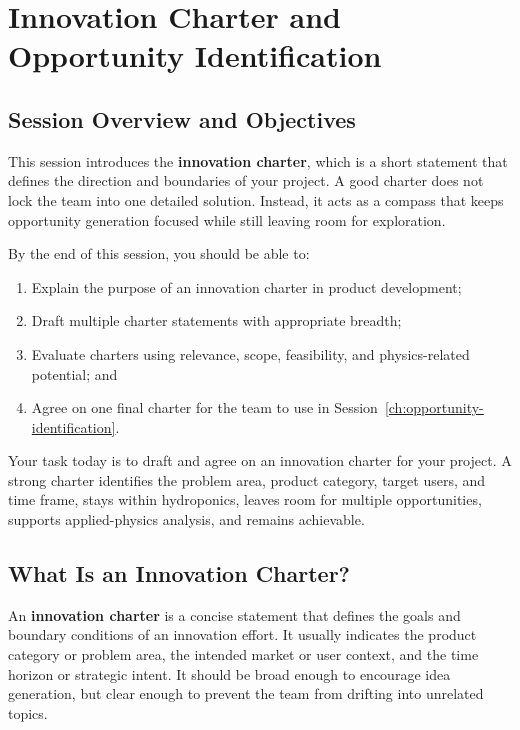 \chapter{Innovation Charter and Opportunity Identification}
\label{sec:innovation-charter}

\section{Session Overview and Objectives}

This session introduces the \textbf{innovation charter}, which is a short statement that defines the direction and boundaries of your project. A good charter does not lock the team into one detailed solution. Instead, it acts as a compass that keeps opportunity generation focused while still leaving room for exploration.

By the end of this session, you should be able to:
\begin{enumerate}
    \item Explain the purpose of an innovation charter in product development;
    \item Draft multiple charter statements with appropriate breadth;
    \item Evaluate charters using relevance, scope, feasibility, and physics-related potential; and
    \item Agree on one final charter for the team to use in Session~\ref{ch:opportunity-identification}.
\end{enumerate}

\begin{tcolorbox}[title=Goal]
Your task today is to draft and agree on an innovation charter for your project. A strong charter identifies the problem area, product category, target users, and time frame, stays within hydroponics, leaves room for multiple opportunities, supports applied-physics analysis, and remains achievable.
\end{tcolorbox}

\section{What Is an Innovation Charter?}

An \textbf{innovation charter} is a concise statement that defines the goals and boundary conditions of an innovation effort. It usually indicates the product category or problem area, the intended market or user context, and the time horizon or strategic intent. It should be broad enough to encourage idea generation, but clear enough to prevent the team from drifting into unrelated topics.

